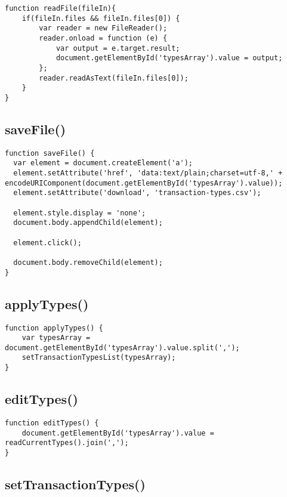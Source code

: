 \documentclass[letterpaper]{article}
\begin{document}
\begin{lstlisting}[firstnumber=644]
function readFile(fileIn){
    if(fileIn.files && fileIn.files[0]) {
        var reader = new FileReader();
        reader.onload = function (e) {
            var output = e.target.result;
            document.getElementById('typesArray').value = output;
        };
        reader.readAsText(fileIn.files[0]);
    }
}
\end{lstlisting}

\subsection{saveFile()}

\begin{lstlisting}[firstnumber=655]
function saveFile() {
  var element = document.createElement('a');
  element.setAttribute('href', 'data:text/plain;charset=utf-8,' + encodeURIComponent(document.getElementById('typesArray').value));
  element.setAttribute('download', 'transaction-types.csv');

  element.style.display = 'none';
  document.body.appendChild(element);

  element.click();

  document.body.removeChild(element);
}
\end{lstlisting}

\subsection{applyTypes()}

\begin{lstlisting}[firstnumber=668]
function applyTypes() {
    var typesArray = document.getElementById('typesArray').value.split(',');
    setTransactionTypesList(typesArray);
}
\end{lstlisting}

\subsection{editTypes()}

\begin{lstlisting}[firstnumber=673]
function editTypes() {
    document.getElementById('typesArray').value = readCurrentTypes().join(',');
}
\end{lstlisting}

\subsection{setTransactionTypes()}
\end{document}
